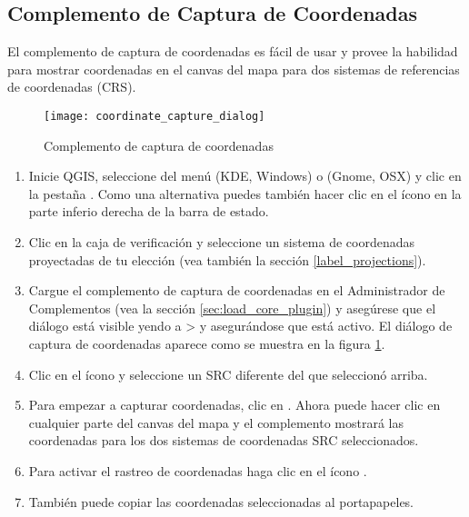 
\subsection{Complemento de Captura de Coordenadas}


El complemento de captura de coordenadas es fácil de usar y provee la 
habilidad para mostrar coordenadas en el canvas del mapa para dos 
sistemas de referencias de coordenadas (CRS).

\begin{figure}[ht]
   \begin{center}
   \caption{Complemento de captura de coordenadas \nixcaption}\label{fig:coordinate_capture_dialog}\smallskip
   \texttt{[image: coordinate\_capture\_dialog]}
\end{center}  
\end{figure}

\begin{enumerate}
  \item Inicie QGIS, seleccione  del 
  menú  (KDE, Windows) o  (Gnome, OSX)  
  y clic en la pestaña . Como una alternativa puedes también  
  hacer clic en el ícono  en la parte 
  inferio derecha de la barra de estado.
  \item Clic en la caja de verificación  y seleccione un 
  sistema de coordenadas proyectadas de tu elección (vea también la sección \ref{label_projections}).
  \item Cargue el complemento de captura de coordenadas en el Administrador de Complementos (vea la sección 
  \ref{sec:load_core_plugin}) y asegúrese que el diálogo está visible yendo a  
   >  y asegurándose que  está activo. 
   El diálogo de captura de coordenadas aparece como se muestra en la figura \ref{fig:coordinate_capture_dialog}.
  \item Clic en el ícono  
  y seleccione un SRC diferente del que seleccionó arriba.
  \item Para empezar a capturar coordenadas, clic en . Ahora puede hacer clic en cualquier parte 
  del canvas del mapa y el complemento mostrará las coordenadas para los dos sistemas de coordenadas SRC seleccionados.
  \item Para activar el rastreo de coordenadas haga clic en el ícono  .
  \item También puede copiar las coordenadas seleccionadas al portapapeles.
\end{enumerate}

\newpage



